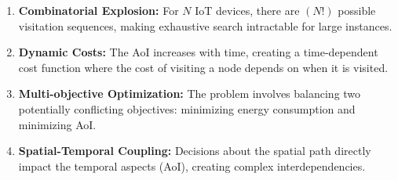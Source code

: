 \documentclass[conference]{IEEEtran}
\begin{document}
\begin{enumerate}
    \item \textbf{Combinatorial Explosion:} For $N$ IoT devices, there are $(N!)$ possible visitation sequences, making exhaustive search intractable for large instances.
    
    \item \textbf{Dynamic Costs:} The AoI increases with time, creating a time-dependent cost function where the cost of visiting a node depends on when it is visited.
    
    \item \textbf{Multi-objective Optimization:} The problem involves balancing two potentially conflicting objectives: minimizing energy consumption and minimizing AoI.
    
    \item \textbf{Spatial-Temporal Coupling:} Decisions about the spatial path directly impact the temporal aspects (AoI), creating complex interdependencies.
\end{enumerate}


    
    
    
\end{document}
